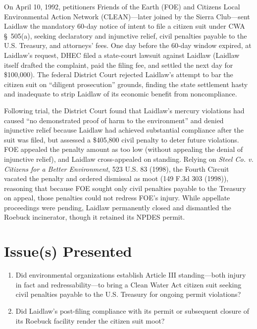 \documentclass[12pt]{article}
\begin{document}
On April 10, 1992, petitioners Friends of the Earth (FOE) and Citizens Local Environmental Action Network (CLEAN)---later joined by the Sierra Club---sent Laidlaw the mandatory 60-day notice of intent to file a citizen suit under CWA \S~505(a), seeking declaratory and injunctive relief, civil penalties payable to the U.S. Treasury, and attorneys' fees. One day before the 60-day window expired, at Laidlaw's request, DHEC filed a state-court lawsuit against Laidlaw (Laidlaw itself drafted the complaint, paid the filing fee, and settled the next day for \$100,000). The federal District Court rejected Laidlaw's attempt to bar the citizen suit on ``diligent prosecution'' grounds, finding the state settlement hasty and inadequate to strip Laidlaw of its economic benefit from noncompliance.

Following trial, the District Court found that Laidlaw's mercury violations had caused ``no demonstrated proof of harm to the environment'' and denied injunctive relief because Laidlaw had achieved substantial compliance after the suit was filed, but assessed a \$405,800 civil penalty to deter future violations. FOE appealed the penalty amount as too low (without appealing the denial of injunctive relief), and Laidlaw cross-appealed on standing. Relying on \textit{Steel Co. v. Citizens for a Better Environment}, 523 U.S. 83 (1998), the Fourth Circuit vacated the penalty and ordered dismissal as moot (149 F.3d 303 (1998)), reasoning that because FOE sought only civil penalties payable to the Treasury on appeal, those penalties could not redress FOE's injury. While appellate proceedings were pending, Laidlaw permanently closed and dismantled the Roebuck incinerator, though it retained its NPDES permit.

\section{Issue(s) Presented}
\begin{enumerate}
  \item Did environmental organizations establish Article III standing---both injury in fact and redressability---to bring a Clean Water Act citizen suit seeking civil penalties payable to the U.S. Treasury for ongoing permit violations?
  \item Did Laidlaw's post-filing compliance with its permit or subsequent closure of its Roebuck facility render the citizen suit moot?
\end{enumerate}
\end{document}
